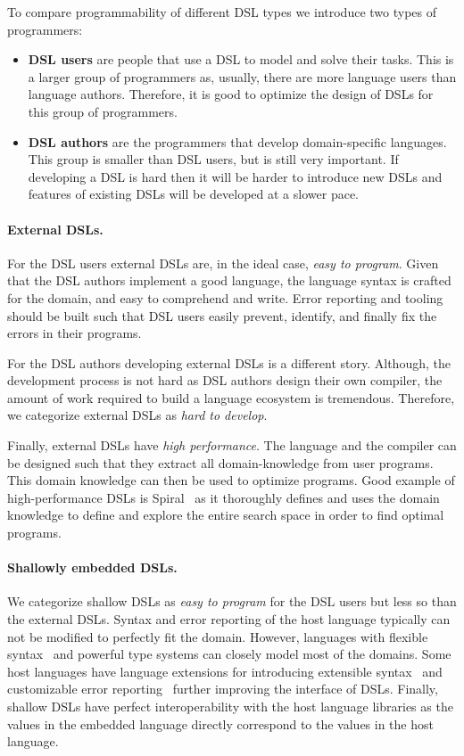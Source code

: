To compare programmability of different DSL types we introduce two types of programmers:\begin{itemize}
  \item {\bf DSL users} are people that use a DSL to model and solve their tasks. This is a larger group of programmers as, usually, there are more language users than language authors. Therefore, it is good to optimize the design of DSLs for this group of programmers.

  \item {\bf DSL authors} are the programmers that develop domain-specific languages. This
   group is smaller than DSL users, but is still very important. If developing a DSL is hard
   then it will be harder to introduce new DSLs and features of existing DSLs will be
   developed at a slower pace.
 \end{itemize}

\paragraph{External DSLs.} For the DSL users external DSLs are, in the ideal case, \emph{easy to program}. Given that the DSL authors implement a good language, the language syntax is crafted for the domain, and easy to comprehend and write. Error reporting and tooling should be built such that DSL users easily prevent, identify, and finally fix the errors in their programs.

For the DSL authors developing external DSLs is a different story. Although, the development
process is not hard as DSL authors design their own compiler, the amount of work
required to build a language ecosystem is tremendous. Therefore, we categorize
external DSLs as \emph{hard to develop}. %

Finally, external DSLs have \emph{high performance}. The language and the compiler can be
designed such that they extract all domain-knowledge from user programs. This domain knowledge
can then be used to optimize programs. Good example of high-performance DSLs is Spiral~\cite{puschel2005spiral} as it thoroughly defines and uses the domain knowledge to define and explore the entire search space in order to find optimal programs.


\paragraph{Shallowly embedded DSLs.} We categorize shallow DSLs as \emph{easy to program} for
 the DSL users but less so than the external DSLs. Syntax and error reporting of the host language
 typically can not be modified to perfectly fit the domain. However, languages with flexible syntax~ and powerful type systems can closely model most of the domains. Some host languages have language extensions for introducing extensible syntax~ and customizable error reporting~ further improving the interface of DSLs. Finally, shallow DSLs have perfect interoperability with the host language libraries as the values in the embedded language directly correspond to the values in the host language.

